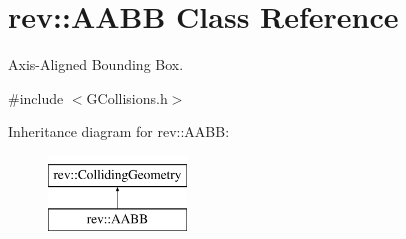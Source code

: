 \hypertarget{classrev_1_1_a_a_b_b}{}\section{rev\+::A\+A\+BB Class Reference}
\label{classrev_1_1_a_a_b_b}


Axis-\/\+Aligned Bounding Box.  




{\ttfamily \#include $<$G\+Collisions.\+h$>$}

Inheritance diagram for rev\+::A\+A\+BB\+:\begin{figure}[H]
\begin{center}
\leavevmode
\includegraphics[height=2.000000cm]{classrev_1_1_a_a_b_b}
\end{center}
\end{figure}
